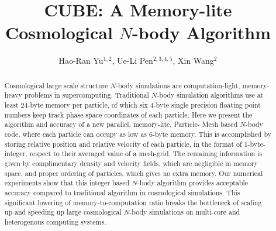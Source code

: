 \documentclass[10pt,twocolumn,preprint]{emulateapj}
\begin{document}
\title{CUBE: A Memory-lite Cosmological $N$-body Algorithm}
\author{
Hao-Ran Yu$^{1,2}$,
Ue-Li Pen$^{2,3,4,5}$,
Xin Wang$^{2}$
}


 
\begin{abstract}
Cosmological large scale structure $N$-body simulations are computation-light,
memory-heavy problems in supercomputing. Traditional $N$-body simulation
algorithms use at least 24-byte memory per particle, of which six 4-byte single 
precision floating point numbers keep track phase space coordinates of each particle.
Here we present the algorithm and accuracy of a new parallel, memory-lite, Particle-
Mesh based $N$-body code, where each particle can occupy as low as 6-byte memory. This 
is accomplished by storing relative position and relative velocity of each particle, 
in the format of 1-byte-integer, respect to their averaged value of a mesh-grid. The 
remaining information is given by complimentary density and velocity fields, which are 
negligible in memory space, and proper ordering of particles, which gives no extra 
memory. Our numerical experiments show that this integer based $N$-body algorithm 
provides acceptable accuracy compared to traditional algorithm in cosmological 
simulations. This significant lowering of memory-to-computation ratio breaks the 
bottleneck of scaling up and speeding up large cosmological $N$-body simulations on 
multi-core and heterogenous computing systems.

\end{abstract}

\keywords{}

\maketitle
\end{document}
